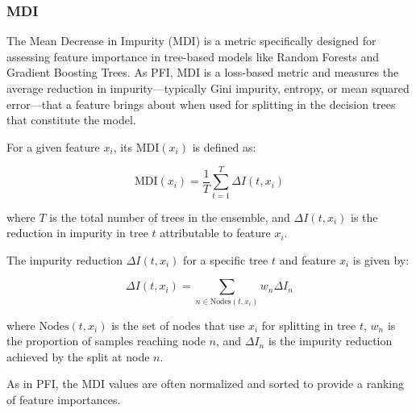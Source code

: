 \subsubsection{MDI}

The Mean Decrease in Impurity (MDI) is a metric specifically designed for assessing feature importance in tree-based models like Random Forests and Gradient Boosting Trees. As \gls{PFI}, \gls{MDI} is a loss-based metric and measures the average reduction in impurity—typically Gini impurity, entropy, or mean squared error—that a feature brings about when used for splitting in the decision trees that constitute the model.

For a given feature \( x_i \), its \( \text{MDI}(x_i) \) is defined as:

\begin{equation}
\text{MDI}(x_i) = \frac{1}{T} \sum_{t=1}^{T} \Delta I(t, x_i)
\end{equation}

where \( T \) is the total number of trees in the ensemble, and \( \Delta I(t, x_i) \) is the reduction in impurity in tree \( t \) attributable to feature \( x_i \).

The impurity reduction \( \Delta I(t, x_i) \) for a specific tree \( t \) and feature \( x_i \) is given by:

\begin{equation}
\Delta I(t, x_i) = \sum_{n \in \text{Nodes}(t, x_i)} w_n \Delta I_n
\end{equation}

where \( \text{Nodes}(t, x_i) \) is the set of nodes that use \( x_i \) for splitting in tree \( t \), \( w_n \) is the proportion of samples reaching node \( n \), and \( \Delta I_n \) is the impurity reduction achieved by the split at node \( n \).

As in \gls{PFI}, the \gls{MDI} values are often normalized and sorted to provide a ranking of feature importances.

